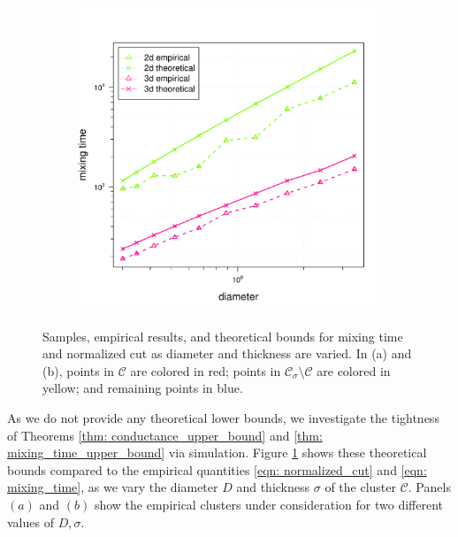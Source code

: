\documentclass{article}
\newcommand{\1}{\mathbf{1}}
\newcommand{\Cset}{\mathcal{C}}
\newcommand{\Csig}{\Cset_{\sigma}}
\theoremstyle{aldenthm}
\theoremstyle{aldenrmrk}
\begin{document}
\begin{figure}
\begin{adjustbox}{minipage=\linewidth,scale=0.8}
\begin{subfigure}{.33\linewidth}
			\caption{}
		\end{subfigure}
		\begin{subfigure}{.33\linewidth}
			\includegraphics[width=\linewidth]{example1plots/diameter_mixing_time_plot}
			\caption{}
		\end{subfigure}
		\caption{Samples, empirical results, and theoretical bounds for mixing time and normalized cut as diameter and thickness are varied. In (a) and (b), points in $\Cset$ are colored in red; points in $\Csig \setminus \Cset$ are colored in yellow; and remaining points in blue.}
		\label{fig:fig1}
	\end{adjustbox}
\end{figure}

As we do not provide any theoretical lower bounds, we investigate the tightness of Theorems \ref{thm: conductance_upper_bound} and \ref{thm: mixing_time_upper_bound} via simulation. Figure \ref{fig:fig1} shows these theoretical bounds compared to the empirical quantities \eqref{eqn: normalized_cut} and \eqref{eqn: mixing_time}, as we vary the diameter $D$ and thickness $\sigma$ of the cluster $\Cset$. Panels $(a)$ and $(b)$ show the empirical clusters under consideration for two different values of $D,\sigma$.
\end{document}
